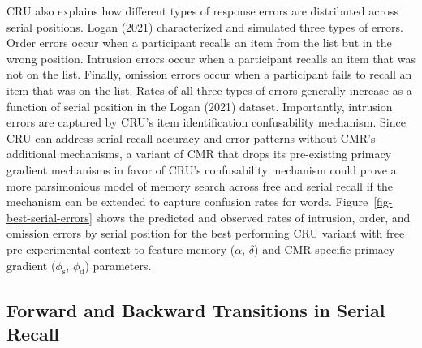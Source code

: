 \documentclass[
  letterpaper,
  11pt,
  english,
  singlespacing,
  headsepline]{MastersDoctoralThesis}
\begin{document}
CRU also explains how different types of response errors are distributed
across serial positions. Logan (2021) characterized and simulated three
types of errors. Order errors occur when a participant recalls an item
from the list but in the wrong position. Intrusion errors occur when a
participant recalls an item that was not on the list. Finally, omission
errors occur when a participant fails to recall an item that was on the
list. Rates of all three types of errors generally increase as a
function of serial position in the Logan (2021) dataset. Importantly,
intrusion errors are captured by CRU's item identification confusability
mechanism. Since CRU can address serial recall accuracy and error
patterns without CMR's additional mechanisms, a variant of CMR that
drops its pre-existing primacy gradient mechanisms in favor of CRU's
confusability mechanism could prove a more parsimonious model of memory
search across free and serial recall if the mechanism can be extended to
capture confusion rates for words. Figure~\ref{fig-best-serial-errors}
shows the predicted and observed rates of intrusion, order, and omission
errors by serial position for the best performing CRU variant with free
pre-experimental context-to-feature memory (\(\alpha\), \(\delta\)) and
CMR-specific primacy gradient (\(\phi_\text{s}\), \(\phi_\text{d}\))
parameters.

\subsection{Forward and Backward Transitions in Serial
Recall}\label{forward-and-backward-transitions-in-serial-recall}
\end{document}
